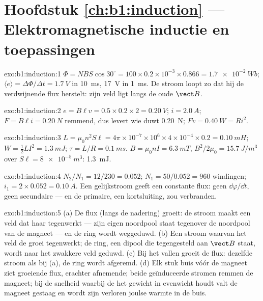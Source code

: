 \section*{Hoofdstuk \ref{ch:b1:induction} --- Elektromagnetische inductie en toepassingen}

\begin{solution}{exo:b1:induction:1}
$\Phi = NBS\cos30^\circ = 100 \times 0.2 \times 10^{-3} \times 0.866 = \qty{1.7e-2}{Wb}$;
$\langle e\rangle = \Delta\Phi/\Delta t = \qty{1.7}{V}$ in \qty{10}{ms}, \qty{17}{V} in
\qty{1}{ms}. De stroom loopt zo dat hij de verdwijnende flux herstelt: zijn
veld ligt langs de oude $\vect B$.
\end{solution}

\begin{solution}{exo:b1:induction:2}
$e = B\ell v = 0.5 \times 0.2 \times 2 = \qty{0.20}{V}$; $i = \qty{2.0}{A}$; $F = B\ell i =
\qty{0.20}{N}$ remmend, dus levert wie duwt \qty{0.20}{N}; $Fv = \qty{0.40}{W}
= Ri^2$.
\end{solution}

\begin{solution}{exo:b1:induction:3}
$L = \mu_0n^2S\ell = 4\pi \times 10^{-7} \times 10^6 \times 4 \times 10^{-4} \times 0.2 =
\qty{0.10}{mH}$; $W = \tfrac12LI^2 = \qty{1.3}{mJ}$; $\tau = L/R = \qty{0.1}{ms}$.
$B = \mu_0nI = \qty{6.3}{mT}$, $B^2/2\mu_0 = \qty{15.7}{J/m^3}$ over
$S\ell = \qty{8e-5}{m^3}$: \qty{1.3}{mJ}.
\end{solution}

\begin{solution}{exo:b1:induction:4}
$N_2/N_1 = 12/230 = 0.052$; $N_1 = 50/0.052 = 960$ windingen; $i_1 = 2 \times 0.052 =
\qty{0.10}{A}$. Een gelijkstroom geeft een constante flux: geen $\dd\varphi/\dd t$, geen
secundaire  --- en de primaire, een kortsluiting, zou verbranden.
\end{solution}

\begin{solution}{exo:b1:induction:5}
(a) De flux (langs de nadering) groeit: de stroom maakt een veld dat
haar tegenwerkt --- zijn eigen noordpool staat tegenover de noordpool van de magneet --- en de
ring wordt weggeduwd. (b) Een stroom waarvan het veld de groei tegenwerkt; de
ring, een dipool die tegengesteld aan $\vect B$ staat, wordt naar het zwakkere
veld geduwd. (c) Bij het vallen groeit de flux: dezelfde stroom als bij (a), de ring
wordt afgeremd. (d) Elk stuk buis vóór de magneet ziet groeiende flux,
erachter afnemende; beide geïnduceerde stromen remmen de magneet; bij de
snelheid waarbij de  het gewicht in evenwicht houdt valt de magneet
gestaag en wordt zijn verloren  joulse warmte in de buis.
\end{solution}

